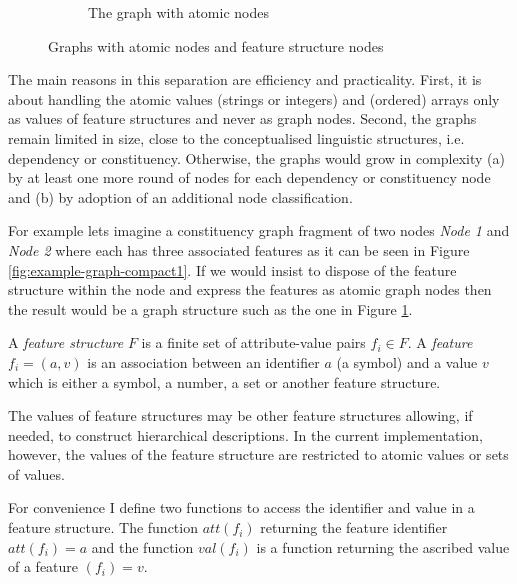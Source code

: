 \begin{figure}[!ht]
\begin{subfigure}[b]{0.5\textwidth}
        \caption{The graph with atomic nodes}
        \label{fig:example-graph-compact2}
    \end{subfigure}%
    \caption{Graphs with atomic nodes and feature structure nodes}
    \label{fig:example-graph-compact}
\end{figure}

The main reasons in this separation are efficiency and practicality. First, it is about handling the atomic values (strings or integers) and (ordered) arrays only as values of feature structures and never as graph nodes. Second, the graphs remain limited in size, close to the conceptualised linguistic structures, i.e. dependency or constituency. Otherwise, the graphs would grow in complexity (a) by at least one more round of nodes for each dependency or constituency node and (b) by adoption of an additional node classification.

For example lets imagine a constituency graph fragment of two nodes \textit{Node 1} and \textit{Node 2} where each has three associated features as it can be seen in Figure \ref{fig:example-graph-compact1}. If we would insist to dispose of the feature structure within the node and express the features as atomic graph nodes then the result would be a graph structure such as the one in Figure \ref{fig:example-graph-compact2}.

\begin{definition}\label{def:fs}
	A \textit{feature structure} $F$ is a finite set of attribute-value pairs $f_{i} \in F$. A \textit{feature} $f_{i}=(a,v)$ is an association between an identifier $a$ (a symbol) and a value $v$ which is either a symbol, a number, a set or another feature structure. 
\end{definition}

The values of feature structures may be other feature structures allowing, if needed, to construct hierarchical descriptions. In the current implementation, however, the values of the feature structure are restricted to atomic values or sets of values.

For convenience I define two functions to access the identifier and value in a feature structure. The function $att(f_{i})$ returning the feature identifier $att(f_{i})=a$ and the function $val(f_{i})$ is a function returning the ascribed value of a feature $(f_{i})=v$. 

